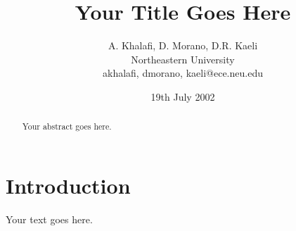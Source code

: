 \documentclass[10pt,twocolumn]{article}
\begin{document}
%
%
%
\title{Your Title Goes Here}
%
\author{
A. Khalafi, D. Morano, D.R. Kaeli\\
Northeastern University\\
{akhalafi, dmorano, kaeli}@ece.neu.edu
}
%
%
\date{19th July 2002}
%
\maketitle
%
%
%
\begin{abstract}

Your abstract goes here.

\end{abstract}
%
%
\vspace{-0.25in}
\section{Introduction}
\vspace{-0.15in}
%
Your text goes here.
%


%
\end{document}
